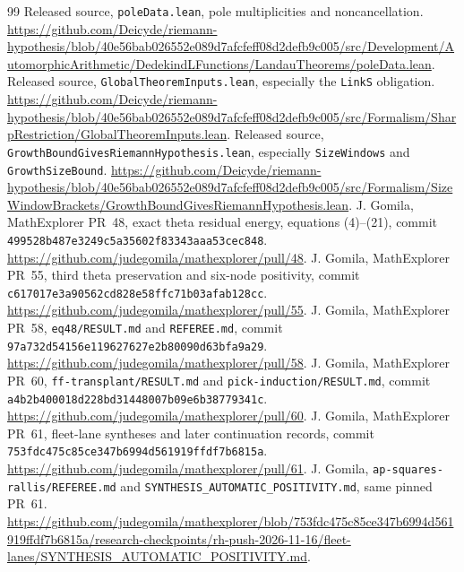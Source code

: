 \documentclass[11pt,letterpaper]{article}
\theoremstyle{definition}
\theoremstyle{remark}
\numberwithin{equation}{section}
\begin{document}
\begin{thebibliography}{99}
 Released source, \texttt{poleData.lean}, pole multiplicities and noncancellation. \url{https://github.com/Deicyde/riemann-hypothesis/blob/40e56bab026552e089d7afcfeff08d2defb9c005/src/Development/AutomorphicArithmetic/DedekindLFunctions/LandauTheorems/poleData.lean}.
 Released source, \texttt{GlobalTheoremInputs.lean}, especially the \texttt{LinkS} obligation. \url{https://github.com/Deicyde/riemann-hypothesis/blob/40e56bab026552e089d7afcfeff08d2defb9c005/src/Formalism/SharpRestriction/GlobalTheoremInputs.lean}.
 Released source, \texttt{GrowthBoundGivesRiemannHypothesis.lean}, especially \texttt{SizeWindows} and \texttt{GrowthSizeBound}. \url{https://github.com/Deicyde/riemann-hypothesis/blob/40e56bab026552e089d7afcfeff08d2defb9c005/src/Formalism/SizeWindowBrackets/GrowthBoundGivesRiemannHypothesis.lean}.
 J. Gomila, MathExplorer PR~48, exact theta residual energy, equations (4)--(21), commit \texttt{499528b487e3249c5a35602f83343aaa53cec848}. \url{https://github.com/judegomila/mathexplorer/pull/48}.
 J. Gomila, MathExplorer PR~55, third theta preservation and six-node positivity, commit \texttt{c617017e3a90562cd828e58ffc71b03afab128cc}. \url{https://github.com/judegomila/mathexplorer/pull/55}.
 J. Gomila, MathExplorer PR~58, \texttt{eq48/RESULT.md} and \texttt{REFEREE.md}, commit \texttt{97a732d54156e119627627e2b80090d63bfa9a29}. \url{https://github.com/judegomila/mathexplorer/pull/58}.
 J. Gomila, MathExplorer PR~60, \texttt{ff-transplant/RESULT.md} and \texttt{pick-induction/RESULT.md}, commit \texttt{a4b2b400018d228bd31448007b09e6b38779341c}. \url{https://github.com/judegomila/mathexplorer/pull/60}.
 J. Gomila, MathExplorer PR~61, fleet-lane syntheses and later continuation records, commit \texttt{753fdc475c85ce347b6994d561919ffdf7b6815a}. \url{https://github.com/judegomila/mathexplorer/pull/61}.
 J. Gomila, \texttt{ap-squares-rallis/REFEREE.md} and \texttt{SYNTHESIS\_AUTOMATIC\_POSITIVITY.md}, same pinned PR~61. \url{https://github.com/judegomila/mathexplorer/blob/753fdc475c85ce347b6994d561919ffdf7b6815a/research-checkpoints/rh-push-2026-11-16/fleet-lanes/SYNTHESIS_AUTOMATIC_POSITIVITY.md}.
\end{thebibliography}
\end{document}
